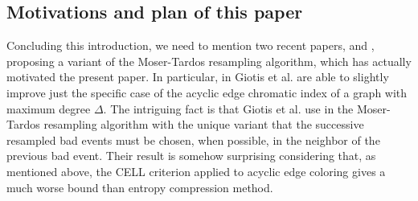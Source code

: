 \documentclass[11pt]{article}
\let\D=\Delta \let\F=\Phi \let\G=\Gamma \let\L=\Lambda \let\Th=\Theta
\let\\=\noindent
\let\D=\Delta \let\F=\Phi \let\G=\Gamma \let\L=\Lambda \let\Th=\Theta
\let\\=\noindent
\begin{document}
\subsection{Motivations and plan of this paper}



\\Concluding this introduction, we  need to mention   two recent papers, \cite{KL} and \cite{GKPT}, proposing a variant of the Moser-Tardos resampling algorithm, which has  actually motivated  the present paper. In particular, in \cite{GKPT} Giotis et al.  are able to slightly improve just the specific case of the acyclic edge chromatic index of a graph with maximum degree $\D$.  The
intriguing fact is that Giotis et al. use in \cite{GKPT}  the Moser-Tardos resampling algorithm with the unique variant that the successive resampled bad events must be chosen, when possible, in the neighbor of the previous bad event.
Their result is somehow surprising considering that, as mentioned above,
the  CELL  criterion applied to acyclic edge coloring gives a much worse bound than entropy compression method.





\end{document}
